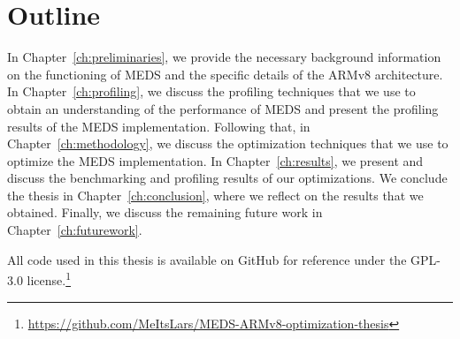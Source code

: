 \documentclass[11pt,a4paper]{report}
\theoremstyle{definition}
\begin{document}
\section{Outline}
In Chapter~\ref{ch:preliminaries}, we provide the necessary background information on the functioning of MEDS and the specific details of the ARMv8 architecture. In Chapter~\ref{ch:profiling}, we discuss the profiling techniques that we use to obtain an understanding of the performance of MEDS and present the profiling results of the MEDS implementation. Following that, in Chapter~\ref{ch:methodology}, we discuss the optimization techniques that we use to optimize the MEDS implementation. In Chapter~\ref{ch:results}, we present and discuss the benchmarking and profiling results of our optimizations. We conclude the thesis in Chapter~\ref{ch:conclusion}, where we reflect on the results that we obtained. Finally, we discuss the remaining future work in Chapter~\ref{ch:futurework}.

All code used in this thesis is available on GitHub for reference under the GPL-3.0 license.\footnote{\url{https://github.com/MeItsLars/MEDS-ARMv8-optimization-thesis}}

\end{document}
